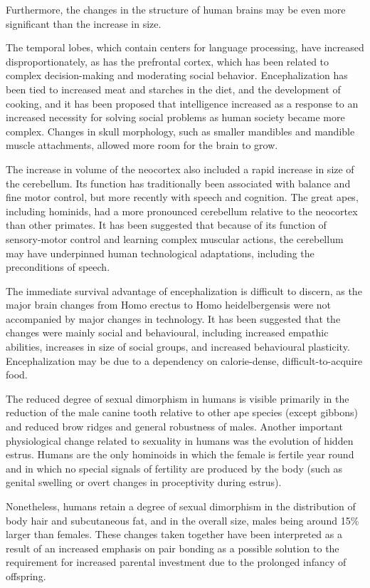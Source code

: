 Furthermore, the changes in the structure of human brains may be even more significant than the increase in size.

The temporal lobes, which contain centers for language processing, have increased disproportionately, as has the prefrontal cortex, which has been related to complex decision-making and moderating social behavior. Encephalization has been tied to increased meat and starches in the diet, and the development of cooking, and it has been proposed that intelligence increased as a response to an increased necessity for solving social problems as human society became more complex. Changes in skull morphology, such as smaller mandibles and mandible muscle attachments, allowed more room for the brain to grow.

The increase in volume of the neocortex also included a rapid increase in size of the cerebellum. Its function has traditionally been associated with balance and fine motor control, but more recently with speech and cognition. The great apes, including hominids, had a more pronounced cerebellum relative to the neocortex than other primates. It has been suggested that because of its function of sensory-motor control and learning complex muscular actions, the cerebellum may have underpinned human technological adaptations, including the preconditions of speech.

The immediate survival advantage of encephalization is difficult to discern, as the major brain changes from Homo erectus to Homo heidelbergensis were not accompanied by major changes in technology. It has been suggested that the changes were mainly social and behavioural, including increased empathic abilities, increases in size of social groups, and increased behavioural plasticity. Encephalization may be due to a dependency on calorie-dense, difficult-to-acquire food.

The reduced degree of sexual dimorphism in humans is visible primarily in the reduction of the male canine tooth relative to other ape species (except gibbons) and reduced brow ridges and general robustness of males. Another important physiological change related to sexuality in humans was the evolution of hidden estrus. Humans are the only hominoids in which the female is fertile year round and in which no special signals of fertility are produced by the body (such as genital swelling or overt changes in proceptivity during estrus).

Nonetheless, humans retain a degree of sexual dimorphism in the distribution of body hair and subcutaneous fat, and in the overall size, males being around 15\% larger than females. These changes taken together have been interpreted as a result of an increased emphasis on pair bonding as a possible solution to the requirement for increased parental investment due to the prolonged infancy of offspring.

